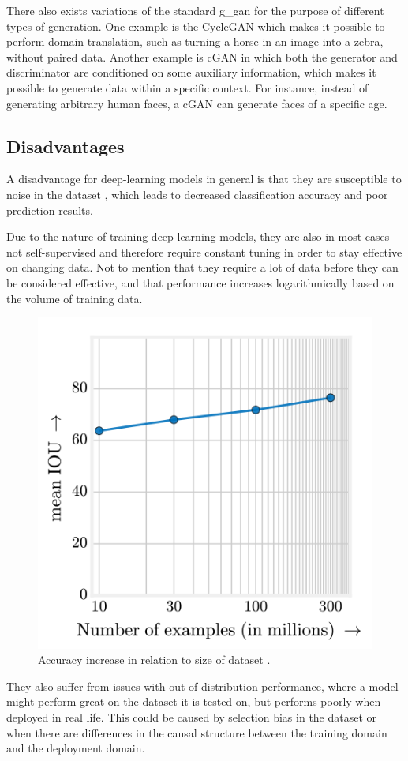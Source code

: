 \par
There also exists variations of the standard \gls*{g_gan} for the purpose of different types of generation. One example is the CycleGAN\cite{CycleGAN} which makes it possible to perform domain translation, such as turning a horse in an image into a zebra, without paired data. Another example is cGAN\cite{cgan}  in which both the generator and discriminator are conditioned on some auxiliary information, which makes it possible to generate data within a specific context. For instance, instead of generating arbitrary human faces, a cGAN can generate faces of a specific age.
\subsection{Disadvantages}
A disadvantage for deep-learning models in general is that they are susceptible to noise in the dataset \cite{noise1,noise2}, which leads to decreased classification accuracy and poor prediction results.
\par
Due to the nature of training deep learning models, they are also in most cases not self-supervised and therefore require constant tuning in order to stay effective on changing data. Not to mention that they require a lot of data before they can be considered effective, and that performance increases logarithmically based on the volume of training data\cite{deeplearning_dataset}.
\begin{figure}[H]
    \centering
    \includegraphics[width=0.5\linewidth]{resources/related_works/deeplearning_datasize.png}
    \caption{Accuracy increase in relation to size of dataset \cite{deeplearning_dataset}.}
\end{figure}
They also suffer from issues with out-of-distribution performance, where a model might perform great on the dataset it is tested on, but performs poorly when deployed in real life. This could be caused by selection bias in the dataset or when there are differences in the causal structure between the training domain and the deployment domain\cite{deeplearning_ood}.
